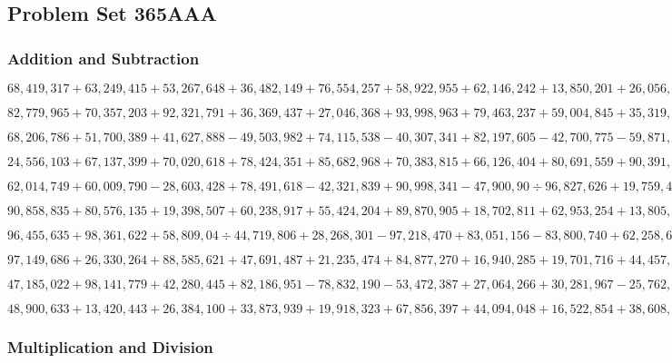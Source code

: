 \hypertarget{problem-set-365aaa}{%
\subsection{Problem Set 365AAA}\label{problem-set-365aaa}}

\hypertarget{addition-and-subtraction}{%
\subsubsection{Addition and
Subtraction}\label{addition-and-subtraction}}

\(68,419,317+63,249,415+53,267,648+36,482,149+76,554,257+58,922,955+62,146,242+13,850,201+26,056,585+85,877,793\)

\(82,779,965+70,357,203+92,321,791+36,369,437+27,046,368+93,998,963+79,463,237+59,004,845+35,319,407+44,301,773\)

\(68,206,786+51,700,389+41,627,888-49,503,982+74,115,538-40,307,341+82,197,605-42,700,775-59,871,541+35,543,412\)

\(24,556,103+67,137,399+70,020,618+78,424,351+85,682,968+70,383,815+66,126,404+80,691,559+90,391,335+85,231,237\)

\(62,014,749+60,009,790-28,603,428+78,491,618-42,321,839+90,998,341-47,900,90÷96,827,626+19,759,451+36,108,270\)

\(90,858,835+80,576,135+19,398,507+60,238,917+55,424,204+89,870,905+18,702,811+62,953,254+13,805,379+52,365,416\)

\(96,455,635+98,361,622+58,809,04÷44,719,806+28,268,301-97,218,470+83,051,156-83,800,740+62,258,682-58,992,225\)

\(97,149,686+26,330,264+88,585,621+47,691,487+21,235,474+84,877,270+16,940,285+19,701,716+44,457,245+16,474,315\)

\(47,185,022+98,141,779+42,280,445+82,186,951-78,832,190-53,472,387+27,064,266+30,281,967-25,762,222-83,861,616\)

\(48,900,633+13,420,443+26,384,100+33,873,939+19,918,323+67,856,397+44,094,048+16,522,854+38,608,840+96,994,123\)

\hypertarget{multiplication-and-division}{%
\subsubsection{Multiplication and
Division}\label{multiplication-and-division}}

